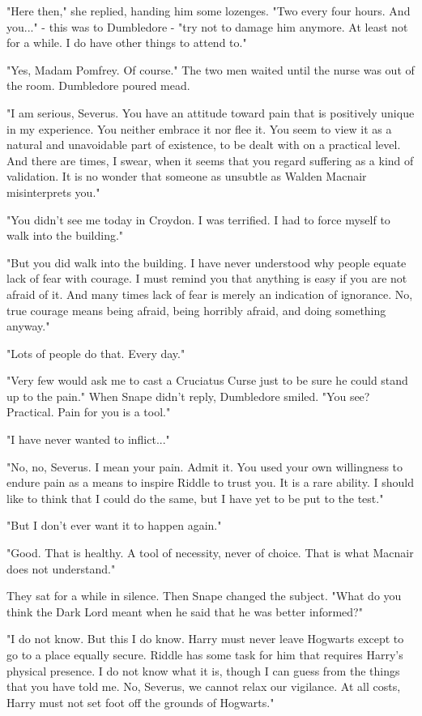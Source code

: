 \documentclass[a4paper,11pt]{article}
\begin{document}
"Here then," she replied, handing him some lozenges. "Two every four hours. And you..." - this was to Dumbledore - "try not to damage him anymore. At least not for a while. I do have other things to attend to."

"Yes, Madam Pomfrey. Of course." The two men waited until the nurse was out of the room. Dumbledore poured mead.

"I am serious, Severus. You have an attitude toward pain that is positively unique in my experience. You neither embrace it nor flee it. You seem to view it as a natural and unavoidable part of existence, to be dealt with on a practical level. And there are times, I swear, when it seems that you regard suffering as a kind of validation. It is no wonder that someone as unsubtle as Walden Macnair misinterprets you."

"You didn't see me today in Croydon. I was terrified. I had to force myself to walk into the building."

"But you did walk into the building. I have never understood why people equate lack of fear with courage. I must remind you that anything is easy if you are not afraid of it. And many times lack of fear is merely an indication of ignorance. No, true courage means being afraid, being horribly afraid, and doing something anyway."

"Lots of people do that. Every day."

"Very few would ask me to cast a Cruciatus Curse just to be sure he could stand up to the pain." When Snape didn't reply, Dumbledore smiled. "You see? Practical. Pain for you is a tool."

"I have never wanted to inflict..."

"No, no, Severus. I mean your pain. Admit it. You used your own willingness to endure pain as a means to inspire Riddle to trust you. It is a rare ability. I should like to think that I could do the same, but I have yet to be put to the test."

"But I don't ever want it to happen again."

"Good. That is healthy. A tool of necessity, never of choice. That is what Macnair does not understand."

They sat for a while in silence. Then Snape changed the subject. "What do you think the Dark Lord meant when he said that he was better informed?"

"I do not know. But this I do know. Harry must never leave Hogwarts except to go to a place equally secure. Riddle has some task for him that requires Harry's physical presence. I do not know what it is, though I can guess from the things that you have told me. No, Severus, we cannot relax our vigilance. At all costs, Harry must not set foot off the grounds of Hogwarts."
\end{document}
